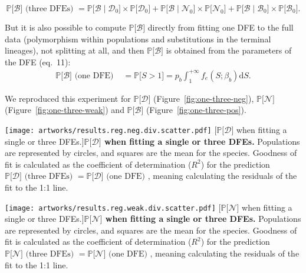 \documentclass{article}
\newcommand{\der}{\text{d}}
\newcommand{\proba}{\mathbb{P}}
\newcommand{\SphyDel}{\mathcal{D}_0}
\newcommand{\SphyNeu}{\mathcal{N}_0}
\newcommand{\SphyBen}{\mathcal{B}_0}
\newcommand{\given}{\mid}
\newcommand{\Spop}{S}
\newcommand{\SpopDel}{\mathcal{D}}
\newcommand{\SpopNeu}{\mathcal{N}}
\newcommand{\SpopBen}{\mathcal{B}}
\newcommand{\AdvMean}{\beta_b}
\begin{document}
    \begin{equation}
        \proba{[} \SpopBen ] \text{ (three DFEs) } = \proba{[}\SpopBen \given \SphyDel ] \times \proba{[}\SphyDel ] + \proba{[}\SpopBen \given \SphyNeu ] \times \proba{[}\SphyNeu ] + \proba{[}\SpopBen \given \SphyBen ] \times \proba{[}\SphyBen ].
        \label{eq:total_proba}
    \end{equation}

    But it is also possible to compute $\proba{[} \SpopBen {]}$ directly from fitting one DFE to the full data (polymorphism within populations and substitutions in the terminal lineages), not splitting at all, and then $\proba{[} \SpopBen {]}$ is obtained from the parameters of the DFE (eq.\ 11):
    \begin{align}
        \proba{[} \SpopBen ] \text{ (one DFE) } &= \proba{[} \Spop > 1 ] = p_b \int_{1}^{+\infty} f_{e}(\Spop; \AdvMean) \der \Spop. \label{eq:polyProbaAdv}
    \end{align}

    We reproduced this experiment for $\proba{[} \SpopDel {]}$ (Figure~\ref{fig:one-three-neg}), $\proba{[} \SpopNeu {]}$ (Figure~\ref{fig:one-three-weak}) and $\proba{[} \SpopBen {]}$ (Figure~\ref{fig:one-three-pos}).


    \begin{center}
        \texttt{[image: artworks/results.reg.neg.div.scatter.pdf]}
        [$\proba{[} \SpopDel {]}$ when fitting a single or three DFEs.]{\textbf{$\bm{\proba{[} \SpopDel {]}}$ when fitting a single or three DFEs.} Populations are represented by circles, and squares are the mean for the species. Goodness of fit is calculated as the coefficient of determination ($R^2$) for the prediction $\proba{[} \SpopDel ] \text{ (three DFEs) } = \proba{[} \SpopDel ] \text{ (one DFE) }$, meaning calculating the residuals of the fit to the 1:1 line.\label{fig:one-three-neg}}
    \end{center}

    \newpage
    \begin{center}
        \texttt{[image: artworks/results.reg.weak.div.scatter.pdf]}
        [$\proba{[} \SpopNeu {]}$ when fitting a single or three DFEs.]{\textbf{$\bm{\proba{[} \SpopNeu {]}}$ when fitting a single or three DFEs.} Populations are represented by circles, and squares are the mean for the species. Goodness of fit is calculated as the coefficient of determination ($R^2$) for the prediction $\proba{[} \SpopNeu ] \text{ (three DFEs) } = \proba{[} \SpopNeu ] \text{ (one DFE) }$, meaning calculating the residuals of the fit to the 1:1 line.\label{fig:one-three-weak}}
    \end{center}
\end{document}

